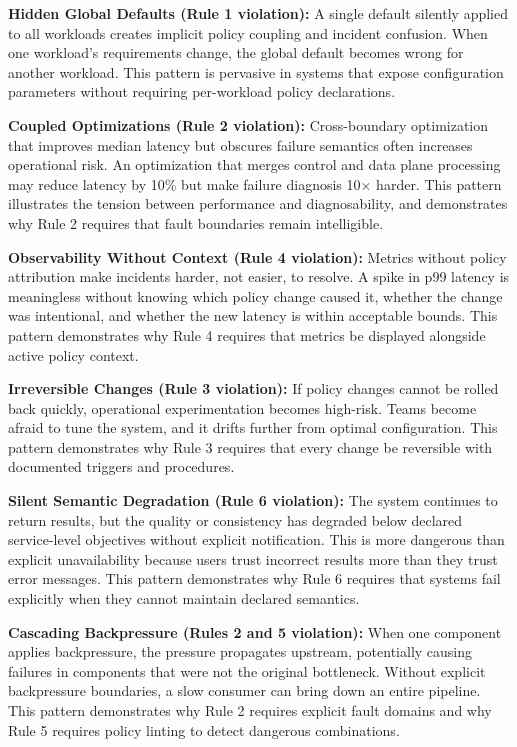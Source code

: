 \documentclass[conference]{IEEEtran}
\begin{document}
\textbf{Hidden Global Defaults (Rule 1 violation):} A single default silently applied to all workloads creates implicit policy coupling and incident confusion. When one workload's requirements change, the global default becomes wrong for another workload. This pattern is pervasive in systems that expose configuration parameters without requiring per-workload policy declarations.

\textbf{Coupled Optimizations (Rule 2 violation):} Cross-boundary optimization that improves median latency but obscures failure semantics often increases operational risk. An optimization that merges control and data plane processing may reduce latency by 10\% but make failure diagnosis 10$\times$ harder. This pattern illustrates the tension between performance and diagnosability, and demonstrates why Rule 2 requires that fault boundaries remain intelligible.

\textbf{Observability Without Context (Rule 4 violation):} Metrics without policy attribution make incidents harder, not easier, to resolve. A spike in p99 latency is meaningless without knowing which policy change caused it, whether the change was intentional, and whether the new latency is within acceptable bounds. This pattern demonstrates why Rule 4 requires that metrics be displayed alongside active policy context.

\textbf{Irreversible Changes (Rule 3 violation):} If policy changes cannot be rolled back quickly, operational experimentation becomes high-risk. Teams become afraid to tune the system, and it drifts further from optimal configuration. This pattern demonstrates why Rule 3 requires that every change be reversible with documented triggers and procedures.

\textbf{Silent Semantic Degradation (Rule 6 violation):} The system continues to return results, but the quality or consistency has degraded below declared service-level objectives without explicit notification. This is more dangerous than explicit unavailability because users trust incorrect results more than they trust error messages. This pattern demonstrates why Rule 6 requires that systems fail explicitly when they cannot maintain declared semantics.

\textbf{Cascading Backpressure (Rules 2 and 5 violation):} When one component applies backpressure, the pressure propagates upstream, potentially causing failures in components that were not the original bottleneck. Without explicit backpressure boundaries, a slow consumer can bring down an entire pipeline. This pattern demonstrates why Rule 2 requires explicit fault domains and why Rule 5 requires policy linting to detect dangerous combinations.
\end{document}

